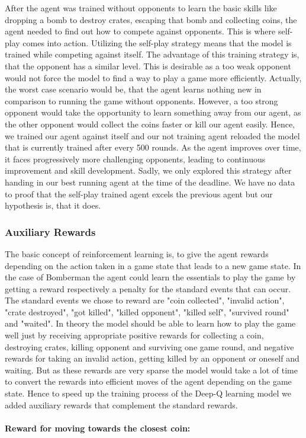 After the agent was trained without opponents to learn the basic skills like dropping a bomb to destroy crates, escaping that bomb and collecting coins, the agent needed to find out how to compete against opponents. This is where self-play comes into action. Utilizing the self-play strategy means that the model is trained while competing against itself. The advantage of this training strategy is, that the opponent has a similar level. This is desirable as a too weak opponent would not force the model to find a way to play a game more efficiently. Actually, the worst case scenario would be, that the agent learns nothing new in comparison to running the game without opponents. However, a too strong opponent would take the opportunity to learn something away from our agent, as the other opponent would collect the coins faster or kill our agent easily. Hence, we trained our agent against itself and our not training agent reloaded the model that is currently trained after every 500 rounds. As the agent improves over time, it faces progressively more challenging opponents, leading to continuous improvement and skill development. \cite{selfplay} Sadly, we only explored this strategy after handing in our best running agent at the time of the deadline. We have no data to proof that the self-play trained agent excels the previous agent but our hypothesis is, that it does.

\subsubsection{Auxiliary Rewards} \label{sec:rewards}

The basic concept of reinforcement learning is, to give the agent rewards depending on the action taken in a game state that leads to a new game state. In the case of Bomberman the agent could learn the essentials to play the game by getting a reward respectively a penalty for the standard events that can occur. The standard events we chose to reward are "coin collected", "invalid action", "crate destroyed", "got killed",  "killed opponent", "killed self", "survived round" and "waited". In theory the model should be able to learn how to play the game well just by receiving appropriate positive rewards for collecting a coin, destroying crates, killing opponent and surviving one game round, and negative rewards for taking an invalid action, getting killed by an opponent or oneself and waiting. But as these rewards are very sparse the model would take a lot of time to convert the rewards into efficient moves of the agent depending on the game state. Hence to speed up the training process of the Deep-Q learning model we added auxiliary rewards that complement the standard rewards.
\\ \\
\textbf{Reward for moving towards the closest coin:}

